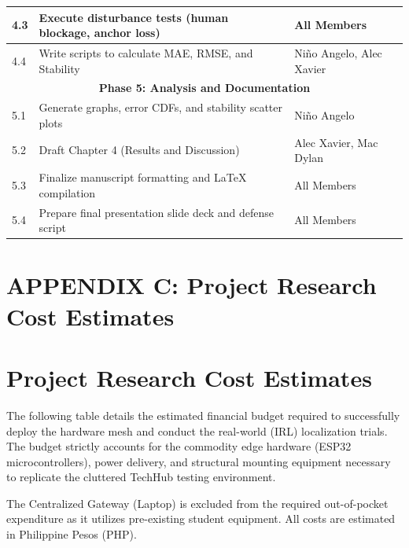 \begin{table}[htbp]
\begin{tabular}{|p{}|p{}|p{}|}
\hline
4.3 & Execute disturbance tests (human blockage, anchor loss) & All Members \\
\hline
4.4 & Write scripts to calculate MAE, RMSE, and Stability & Niño Angelo, Alec Xavier \\
\hline
\multicolumn{3}{|c|}{\textbf{Phase 5: Analysis and Documentation}} \\
\hline
5.1 & Generate graphs, error CDFs, and stability scatter plots & Niño Angelo \\
\hline
5.2 & Draft Chapter 4 (Results and Discussion) & Alec Xavier, Mac Dylan \\
\hline
5.3 & Finalize manuscript formatting and LaTeX compilation & All Members \\
\hline
5.4 & Prepare final presentation slide deck and defense script & All Members \\
\hline
\end{tabular}
\end{table}

\clearpage
\section*{APPENDIX C: Project Research Cost Estimates}

\section{Project Research Cost Estimates}
\label{app:cost}

The following table details the estimated financial budget required to successfully deploy the hardware mesh and conduct the real-world (IRL) localization trials. The budget strictly accounts for the commodity edge hardware (ESP32 microcontrollers), power delivery, and structural mounting equipment necessary to replicate the cluttered TechHub testing environment. 

The Centralized Gateway (Laptop) is excluded from the required out-of-pocket expenditure as it utilizes pre-existing student equipment. All costs are estimated in Philippine Pesos (PHP).

\vspace{1.5em}

